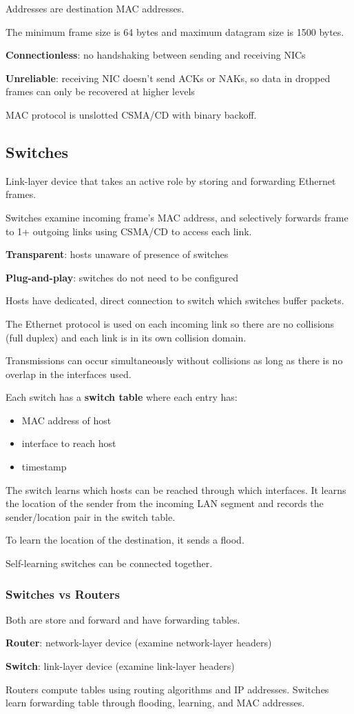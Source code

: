 \documentclass[11pt]{article}
\begin{document}
Addresses are destination MAC addresses.

The minimum frame size is 64 bytes and maximum datagram size is 1500 bytes.

\textbf{Connectionless}: no handshaking between sending and receiving NICs

\textbf{Unreliable}: receiving NIC doesn't send ACKs or NAKs, so data in dropped frames can only be
recovered at higher levels

MAC protocol is unslotted CSMA/CD with binary backoff.
\subsection{Switches}
\label{sec:org74d2729}
Link-layer device that takes an active role by storing and forwarding Ethernet frames.

Switches examine incoming frame's MAC address, and selectively forwards frame to 1+ outgoing links
using CSMA/CD to access each link.

\textbf{Transparent}: hosts unaware of presence of switches

\textbf{Plug-and-play}: switches do not need to be configured

Hosts have dedicated, direct connection to switch which switches buffer packets.

The Ethernet protocol is used on each incoming link so there are no collisions (full duplex)
and each link is in its own collision domain.

Transmissions can occur simultaneously without collisions as long as there is no overlap
in the interfaces used.

Each switch has a \textbf{switch table} where each entry has:
\begin{itemize}
\item MAC address of host
\item interface to reach host
\item timestamp
\end{itemize}

The switch learns which hosts can be reached through which interfaces.
It learns the location of the sender from the incoming LAN segment and records the
sender/location pair in the switch table.

To learn the location of the destination, it sends a flood.

Self-learning switches can be connected together.
\subsubsection{Switches vs Routers}
\label{sec:orgd27085e}
Both are store and forward and have forwarding tables.

\textbf{Router}: network-layer device (examine network-layer headers)

\textbf{Switch}: link-layer device (examine link-layer headers)

Routers compute tables using routing algorithms and IP addresses.
Switches learn forwarding table through flooding, learning, and
MAC addresses.
\end{document}
